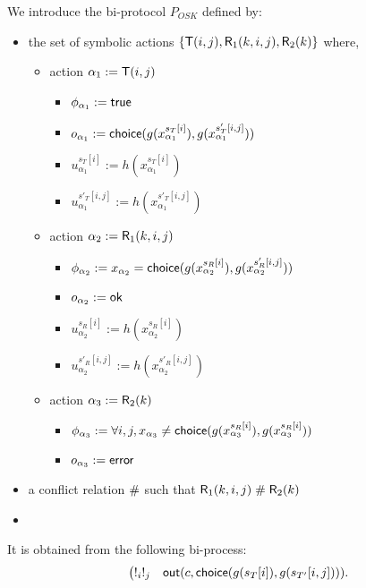 \begin{example}[OSK]
  \label{ex:osk-bi-process}
  We introduce the bi-protocol $P_{OSK}$ defined by:
  \begin{itemize}
    \item the set of symbolic actions $\{\textsf{T}(i,j),\textsf{R}_1(k,i,j),\textsf{R}_2(k)\}$ where,
    \begin{itemize}
      \item action $\alpha_1 := \textsf{T}(i,j)$
        \begin{itemize}
          \item $\phi_{\alpha_1} := \textsf{true}$
          \item $o_{\alpha_1} := \mathsf{choice}(g(x_{\alpha_1}^{s_T[i]}),g(x_{\alpha_1}^{s'_T[i,j]}))$
          \item $u_{\alpha_1}^{s_T[i]} := h(x_{\alpha_1}^{s_T[i]})$
          \item $u_{\alpha_1}^{s'_T[i,j]} := h(x_{\alpha_1}^{s'_T[i,j]})$
        \end{itemize}
      \item action $\alpha_2 := \textsf{R}_1(k,i,j)$
        \begin{itemize}
          \item $\phi_{\alpha_2} := x_{\alpha_2} = \mathsf{choice}(g(x_{\alpha_2}^{s_R[i]}),g(x_{\alpha_2}^{s'_R[i,j]}))$
          \item $o_{\alpha_2} := \mathsf{ok}$
          \item $u_{\alpha_2}^{s_R[i]} := h(x_{\alpha_2}^{s_R[i]})$
          \item $u_{\alpha_2}^{s'_R[i,j]} := h(x_{\alpha_2}^{s'_R[i,j]})$
        \end{itemize}
      \item action $\alpha_3 := \textsf{R}_2(k)$
        \begin{itemize}
          \item $\phi_{\alpha_3} := \forall i,j, x_{\alpha_3} \neq \mathsf{choice}(g(x_{\alpha_3}^{s_R[i]}),g(x_{\alpha_3}^{s_R[i]}))$
          \item $o_{\alpha_3} := \mathsf{error}$
        \end{itemize}
    \end{itemize}
    \item a conflict relation $\mathrel{\#}$ such that $\textsf{R}_1(k,i,j)\mathrel{\#}\textsf{R}_2(k)$
    \item {}
  \end{itemize}
  It is obtained from the following bi-process:
  \[
  \begin{array}{lll}
  & \bigl(!_i !_j & \textsf{out}(c,\mathsf{choice}(g(s_T[i]),g(s_{T'}[i,j]))). \\

\end{array}\]
\end{example}
